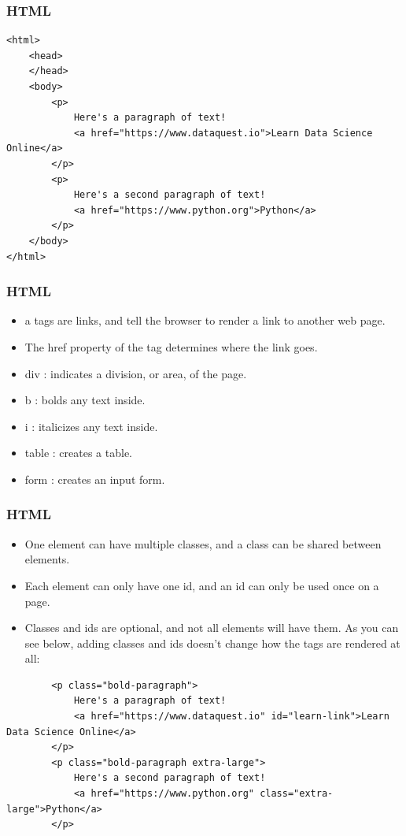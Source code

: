 \begin{frame}[fragile]\frametitle{HTML}
\begin{lstlisting}
<html>
    <head>
    </head>
    <body>
        <p>
            Here's a paragraph of text!
            <a href="https://www.dataquest.io">Learn Data Science Online</a>
        </p>
        <p>
            Here's a second paragraph of text!
            <a href="https://www.python.org">Python</a>
        </p>
    </body>
</html>
\end{lstlisting}
\end{frame}

\begin{frame}[fragile]\frametitle{HTML}

    \begin{itemize}
    \item  a tags are links, and tell the browser to render a link to another web page. 
    \item The href property of the tag determines where the link goes.
    \item     div : indicates a division, or area, of the page.
    \item     b : bolds any text inside.
    \item     i : italicizes any text inside.
    \item     table : creates a table.
    \item     form : creates an input form.
    \end{itemize}
\end{frame}

\begin{frame}[fragile]\frametitle{HTML}

    \begin{itemize}
    \item  One element can have multiple classes, and a class can be shared between elements.
    \item Each element can only have one id, and an id can only be used once on a page.
    \item Classes and ids are optional, and not all elements will have them. As you can see below, adding classes and ids doesn't change how the tags are rendered at all:
    \end{itemize}
    \begin{lstlisting}
        <p class="bold-paragraph">
            Here's a paragraph of text!
            <a href="https://www.dataquest.io" id="learn-link">Learn Data Science Online</a>
        </p>
        <p class="bold-paragraph extra-large">
            Here's a second paragraph of text!
            <a href="https://www.python.org" class="extra-large">Python</a>
        </p>
\end{lstlisting}
\end{frame}

